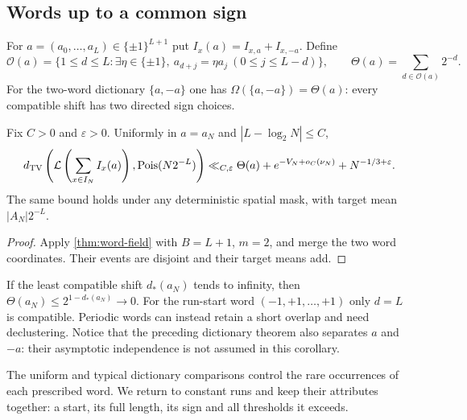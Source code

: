 \subsection{Words up to a common sign}
For $a=(a_0,\ldots,a_L)\in\{\pm1\}^{L+1}$ put
$I_x(a)=I_{x,a}+I_{x,-a}$. Define
\begin{equation}\label{eq:overlap-definition}
 \mathcal O(a)=\{1\le d\le L:\exists\eta\in\{\pm1\},\
         a_{d+j}=\eta a_j\ (0\le j\le L-d)\},\qquad
 \Theta(a)=\sum_{d\in\mathcal O(a)}2^{-d}.
\end{equation}
For the two-word dictionary $\{a,-a\}$ one has
$\Omega(\{a,-a\})=\Theta(a)$: every compatible shift has two directed
sign choices.
\begin{corollary}\label{thm:patterns}
Fix $C>0$ and $\varepsilon>0$. Uniformly in $a=a_N$ and
$|L-\log_2N|\le C$,
\begin{equation}\label{eq:pattern-rate}
 d_{\mathrm{TV}}\left(\mathcal L\left(\sum_{x\in I_N}I_x(a)\right),\operatorname{Pois}(N2^{-L})\right)
 \ll_{C,\varepsilon}\Theta(a)+e^{-V_N+o_C(\nu_N)}+N^{-1/3+\varepsilon}.
\end{equation}
The same bound holds under any deterministic spatial mask, with target
mean $|A_N|2^{-L}$.
\end{corollary}
\begin{proof}
Apply \cref{thm:word-field} with $B=L+1$, $m=2$, and merge the two word
coordinates. Their events are disjoint and their target means add.
\end{proof}
If the least compatible shift $d_*(a_N)$ tends to infinity, then
$\Theta(a_N)\le2^{1-d_*(a_N)}\to0$. For the run-start word
$(-1,+1,\ldots,+1)$ only $d=L$ is compatible. Periodic words can instead
retain a short overlap and need declustering. Notice that the preceding
dictionary theorem also separates $a$ and $-a$: their asymptotic
independence is not assumed in this corollary.

The uniform and typical dictionary comparisons control the rare occurrences of each
prescribed word. We return to constant runs and keep their attributes
together: a start, its full length, its sign and all thresholds it exceeds.

